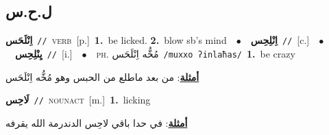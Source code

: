 \documentclass[10pt,a4paper,twoside]{article} %
\begin{document}
\begin{multicols}{2}
\vspace{-3mm}
\subsection*{\color{blue}\foreignlanguage{arabic}{ل.ح.س}\color{blue}{}} 

{\setlength\topsep{0pt}\textbf{\foreignlanguage{arabic}{اِنْلَحَس}}\ {\color{gray}\texttt{//}\color{black}}\ \textsc{verb}\ [p.]\ \textbf{1.}~be licked.  \textbf{2.}~blow sb's mind\ \ $\bullet$\ \ \setlength\topsep{0pt}\textbf{\foreignlanguage{arabic}{اِنْلِحِس}}\ {\color{gray}\texttt{//}\color{black}}\ [c.]\ \ $\bullet$\ \ \setlength\topsep{0pt}\textbf{\foreignlanguage{arabic}{يِنْلِحِس}}\ {\color{gray}\texttt{//}\color{black}}\ [i.]\ \ $\bullet$\ \ \textsc{ph.} \color{gray} \foreignlanguage{arabic}{مُخُّه اِنْلَحَس}\color{black}\ {\color{gray}\texttt{/{\sffamily muxxo ʔinlaħas}/}\color{black}}\ \textbf{1.}~be crazy\  \begin{flushright}\color{gray}\foreignlanguage{arabic}{\textbf{\underline{\foreignlanguage{arabic}{أمثلة}}}: من بعد ماطلع من الحبس وهو مُخُّه اِنْلَحَس}\end{flushright}\color{black}} \vspace{2mm}

{\setlength\topsep{0pt}\textbf{\foreignlanguage{arabic}{لَاحِس}}\ {\color{gray}\texttt{//}\color{black}}\ \textsc{noun\textunderscore act}\ [m.]\ \textbf{1.}~licking\  \begin{flushright}\color{gray}\foreignlanguage{arabic}{\textbf{\underline{\foreignlanguage{arabic}{أمثلة}}}: في حدا باقي لاحِس الدندرمة الله يقرفه}\end{flushright}\color{black}} \vspace{2mm}


\end{multicols}
\end{document}
